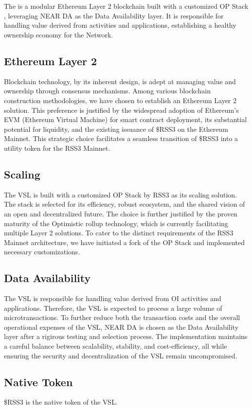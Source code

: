 \section{}
\label{sec:VSL}

The  is a modular Ethereum Layer 2 blockchain built with a customized OP Stack \cite{op-fork}, leveraging NEAR DA \cite{near2023Data} as the Data Availability layer.
It is responsible for handling value derived from  activities and applications, establishing a healthy ownership economy for the Network.

\subsection{Ethereum Layer 2}

Blockchain technology, by its inherent design, is adept at managing value and ownership through consensus mechanisms.
Among various blockchain construction methodologies, we have chosen to establish an Ethereum Layer 2 solution.
This preference is justified by the widespread adoption of Ethereum's EVM (Ethereum Virtual Machine) for smart contract deployment, its substantial potential for liquidity, and the existing issuance of \$RSS3 on the Ethereum Mainnet. 
This strategic choice facilitates a seamless transition of \$RSS3 into a utility token for the RSS3 Mainnet.

\subsection{Scaling}
The \gls{VSL} is built with a customized OP Stack by RSS3 as its scaling solution.
The stack is selected for its efficiency, robust ecosystem, and the shared vision of an open and decentralized future.
The choice is further justified by the proven maturity of the Optimistic rollup technology, which is currently facilitating multiple Layer 2 solutions.
To cater to the distinct requirements of the RSS3 Mainnet architecture, we have initiated a fork of the OP Stack and implemented necessary customizations.

\subsection{Data Availability}

The \gls{VSL} is responsible for handling value derived from \gls{OI} activities and applications.
Therefore, the \gls{VSL} is expected to process a large volume of microtransactions.
To further reduce both the transaction costs and the overall operational expenses of the \gls{VSL}, NEAR DA is chosen as the Data Availability layer after a rigirous testing and selection process.
The implementation maintains a careful balance between scalability, stability, and cost-efficiency, all while ensuring the security and decentralization of the \gls{VSL} remain uncompromised.

\subsection{Native Token}

\$RSS3 is the native token of the \gls{VSL}.

